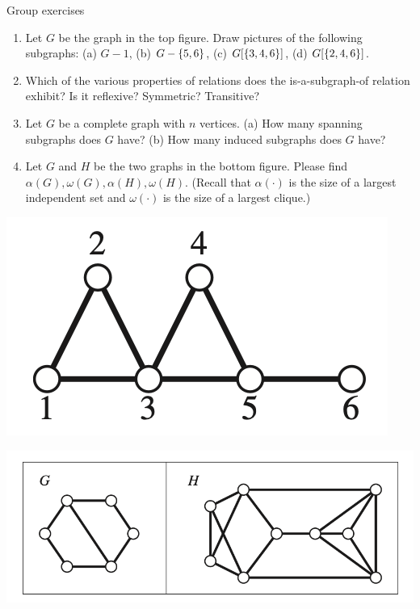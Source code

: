 \documentclass[10pt]{beamer}
\begin{document}
\begin{frame}{Group exercises}
\small 
\noindent
\begin{minipage}[c]{0.6\textwidth}
\begin{enumerate}
	\item  Let $G$ be the graph in the top figure.   Draw pictures of the following subgraphs: (a) $G-1$, (b) $G-\{ {5,6} \}$, (c) $G[\{ {3,4,6} \}]$, (d) $G[\{ {2,4,6} \}]$.
	\item Which of the various properties of relations does the is-a-subgraph-of relation exhibit? Is it reflexive? Symmetric? Transitive?
    \item Let $G$ be a complete graph with $n$ vertices.  (a) How many spanning subgraphs does $G$ have? (b) How many induced subgraphs does $G$ have?
    \item Let $G$ and $H$ be the two graphs in the bottom figure.  Please find $\alpha(G), \omega(G), \alpha(H), \omega(H)$.  (Recall that $\alpha(\cdot)$ is the size of a largest independent set and $\omega(\cdot)$ is the size of a largest clique.) 
\end{enumerate}
\end{minipage}%
\hfill
\begin{minipage}[c]{0.38\textwidth}
   
    \includegraphics[width=\textwidth]{images/subgraph_1} %
    
    \vspace{4cm}
    
    \includegraphics[width=\textwidth]{images/subgraph_2}
\end{minipage}%

\end{frame}
\end{document}
